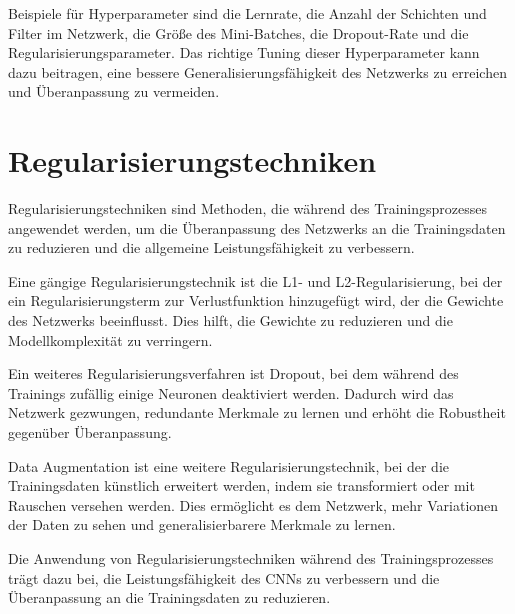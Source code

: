     Beispiele für Hyperparameter sind die Lernrate, die Anzahl der Schichten und Filter im Netzwerk, die Größe des Mini-Batches, die Dropout-Rate und die Regularisierungsparameter. Das richtige Tuning dieser Hyperparameter kann dazu beitragen, eine bessere Generalisierungsfähigkeit des Netzwerks zu erreichen und Überanpassung zu vermeiden.

\section{Regularisierungstechniken}
    Regularisierungstechniken sind Methoden, die während des Trainingsprozesses angewendet werden, um die Überanpassung des Netzwerks an die Trainingsdaten zu reduzieren und die allgemeine Leistungsfähigkeit zu verbessern.
    
    Eine gängige Regularisierungstechnik ist die L1- und L2-Regularisierung, bei der ein Regularisierungsterm zur Verlustfunktion hinzugefügt wird, der die Gewichte des Netzwerks beeinflusst. Dies hilft, die Gewichte zu reduzieren und die Modellkomplexität zu verringern.
    
    Ein weiteres Regularisierungsverfahren ist Dropout, bei dem während des Trainings zufällig einige Neuronen deaktiviert werden. Dadurch wird das Netzwerk gezwungen, redundante Merkmale zu lernen und erhöht die Robustheit gegenüber Überanpassung.
    
    Data Augmentation ist eine weitere Regularisierungstechnik, bei der die Trainingsdaten künstlich erweitert werden, indem sie transformiert oder mit Rauschen versehen werden. Dies ermöglicht es dem Netzwerk, mehr Variationen der Daten zu sehen und generalisierbarere Merkmale zu lernen.
    
    Die Anwendung von Regularisierungstechniken während des Trainingsprozesses trägt dazu bei, die Leistungsfähigkeit des CNNs zu verbessern und die Überanpassung an die Trainingsdaten zu reduzieren.
